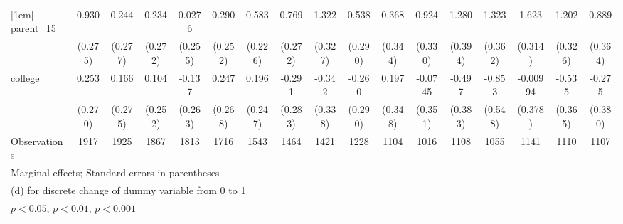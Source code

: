 {\begin{tabular}{l*{16}{c}}
[1em]
parent\_15           &       0.930\sym{***}&       0.244         &       0.234         &      0.0276         &       0.290         &       0.583\sym{**} &       0.769\sym{**} &       1.322\sym{***}&       0.538         &       0.368         &       0.924\sym{**} &       1.280\sym{**} &       1.323\sym{***}&       1.623\sym{***}&       1.202\sym{***}&       0.889\sym{*}  \\
                    &     (0.275)         &     (0.277)         &     (0.272)         &     (0.255)         &     (0.252)         &     (0.226)         &     (0.272)         &     (0.327)         &     (0.290)         &     (0.344)         &     (0.330)         &     (0.394)         &     (0.362)         &     (0.314)         &     (0.326)         &     (0.364)         \\
[1em]
college             &       0.253         &       0.166         &       0.104         &      -0.137         &       0.247         &       0.196         &      -0.291         &      -0.342         &      -0.260         &       0.197         &     -0.0745         &      -0.497         &      -0.853         &    -0.00994         &      -0.535         &      -0.275         \\
                    &     (0.270)         &     (0.275)         &     (0.252)         &     (0.263)         &     (0.268)         &     (0.247)         &     (0.283)         &     (0.338)         &     (0.290)         &     (0.348)         &     (0.351)         &     (0.383)         &     (0.548)         &     (0.378)         &     (0.365)         &     (0.380)         \\
\hline
Observations        &        1917         &        1925         &        1867         &        1813         &        1716         &        1543         &        1464         &        1421         &        1228         &        1104         &        1016         &        1108         &        1055         &        1141         &        1110         &        1107         \\
\hline\hline
\multicolumn{17}{l}{\footnotesize Marginal effects; Standard errors in parentheses}\\
\multicolumn{17}{l}{\footnotesize  (d) for discrete change of dummy variable from 0 to 1}\\
\multicolumn{17}{l}{\footnotesize \sym{*} \(p<0.05\), \sym{**} \(p<0.01\), \sym{***} \(p<0.001\)}\\
\end{tabular}
}
